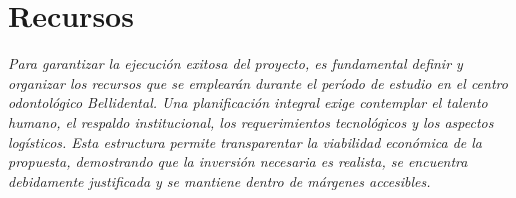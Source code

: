 \section{Recursos}
\textit{Para garantizar la ejecución exitosa del proyecto, es fundamental definir y organizar los recursos que se emplearán durante el período de estudio en el centro odontológico Bellidental. Una planificación integral exige contemplar el talento humano, el respaldo institucional, los requerimientos tecnológicos y los aspectos logísticos. Esta estructura permite transparentar la viabilidad económica de la propuesta, demostrando que la inversión necesaria es realista, se encuentra debidamente justificada y se mantiene dentro de márgenes accesibles.}